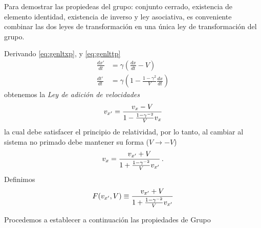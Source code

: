 \begin{frame}
\begin{details}
Para demostrar las propiedeas del grupo: conjunto cerrado, existencia
de elemento identidad, existencia de inverso y ley asociativa, es
conveniente combinar las dos leyes de transformación en una única ley
de transformación del grupo. 
\end{details}
Derivando \eqref{eq:genltxp}, y \eqref{eq:genlttp}
\begin{align*}
  \frac{dx'}{dt}&=\gamma \left(\frac{dx}{dt}-V  \right)\nonumber\\
 \frac{dt'}{dt}&=\gamma \left(1-\frac{1-\gamma^2}{V}\frac{dx}{dt}  \right)
\end{align*}
obtenemos la \emph{Ley de adición de velocidades} %
\begin{align*}
  v_{x'}=\frac{v_x-V}{1-\frac{1-\gamma^{-2}}{V}v_x}
\end{align*}
la cual debe satisfacer el principio de relatividad, por lo tanto, al cambiar al sistema no primado debe mantener su forma ($V\to -V$)
\begin{align}
  \label{eq:adicionvel}
  v_{x}=\frac{v_{x'}+V}{1+\frac{1-\gamma^{-2}}{V}v_{x'}}\,.
\end{align}
Definimos
\begin{align*}
  F(v_{x'},V)\equiv\frac{v_{x'}+V}{1+\frac{1-\gamma^{-2}}{V}v_{x'}}
\end{align*}
\end{frame}

Procedemos a establecer a continuación las propiedades de Grupo

